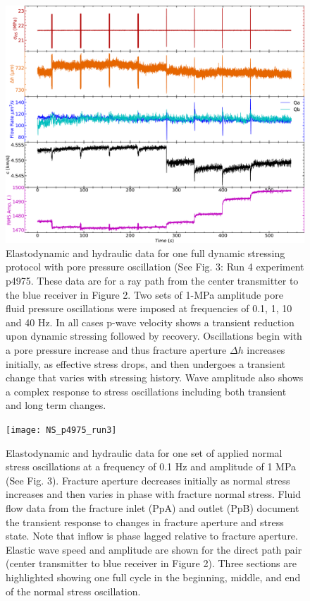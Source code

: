 \documentclass[draft]{agujournal2019}
\begin{document}
\newpage

\begin{figure}[ht]
	\centering
	\includegraphics[width=1\columnwidth]{NS_p4975_run4}
	\caption{Elastodynamic and hydraulic data for one full dynamic stressing protocol with pore pressure oscillation (See Fig. 3: Run 4 experiment p4975. These data are for a ray path from the center transmitter to the blue receiver in Figure 2. Two sets of 1-MPa amplitude pore fluid pressure oscillations were imposed at frequencies of 0.1, 1, 10 and 40 Hz. In all cases p-wave velocity shows a transient reduction upon dynamic stressing followed by recovery. Oscillations begin with a pore pressure increase and thus fracture aperture $\Delta h$ increases initially, as effective stress drops, and then undergoes a transient change that varies with stressing history. Wave amplitude also shows a complex response to stress oscillations including both transient and long term changes. }
	\label{fig:run4_p4975}
\end{figure}

\newpage

\begin{figure}[ht]
	\centering
	\texttt{[image: NS\_p4975\_run3]}
	\caption[]{Elastodynamic and hydraulic data for one set of applied normal stress oscillations at a frequency of 0.1 Hz and amplitude of 1 MPa (See Fig. 3). Fracture aperture decreases initially as normal stress increases and then varies in phase with fracture normal stress. Fluid flow data from the fracture inlet (PpA) and outlet (PpB) document the transient response to changes in fracture aperture and stress state. Note that inflow is phase lagged relative to fracture aperture. Elastic wave speed and amplitude are shown for the direct path pair (center transmitter to blue receiver in Figure 2). Three sections are highlighted showing one full cycle in the beginning, middle, and end of the normal stress oscillation. }
	\label{fig:NS_p4975_run3b_01Hz}
\end{figure}
\end{document}
